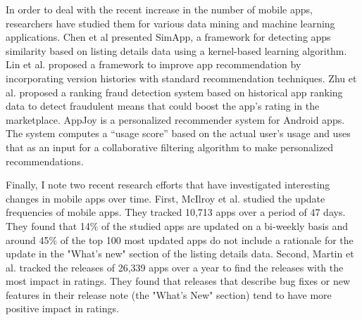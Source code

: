 In order to deal with the recent increase in the number of mobile apps, researchers have studied them for various data mining and machine learning applications.
Chen et al \cite{Chen_2015_WSDM} presented SimApp, a framework for detecting apps similarity based on listing details data using a kernel-based learning algorithm.
Lin et al. \cite{lin_2014_SIGIR} proposed a framework to improve app  recommendation by incorporating version histories with standard recommendation techniques.
Zhu et al. \cite{zhu_2013_CIKM} proposed a ranking fraud detection system based on historical app ranking data to detect fraudulent means that could boost the app's rating in the marketplace.
AppJoy \cite{yan_2011_MobiSys} is a personalized recommender system for Android apps.
The system computes a ``usage score'' based on the actual user's usage and uses that as an input for a collaborative filtering algorithm to make personalized recommendations.

Finally, I note two recent research efforts that have investigated interesting changes in mobile apps over time.
First, McIlroy et al. \cite{McIlroy2016} studied the update frequencies of mobile apps.
They tracked 10,713 apps over a period of 47 days.
They found that 14\% of the studied apps are updated on a bi-weekly basis and around 45\% of the top 100 most updated apps do not include a rationale for the update in the "What's new" section of the listing details data.
Second, Martin et al. \cite{Martin_FSE_2016} tracked the releases of 26,339 apps over a year to find the releases with the most impact in ratings.
They found that releases that describe bug fixes or new features in their release note (the "What's New" section) tend to have more positive impact in ratings.

